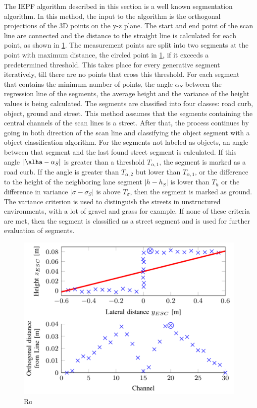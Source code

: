 \documentclass[conference]{IEEEtran}
\begin{document}
The IEPF algorithm described in this section is a well known segmentation algorithm. In this method, the input to the algorithm is the orthogonal projections of the 3D points on the y-z plane. The start and end point of the scan line are connected and the distance to the straight line is calculated for each point, as shown in \ref{fig2}. The measurement points are split into two segments at the point with maximum distance, the circled point in \ref{fig2}, if it exceeds a predetermined threshold. This takes place for every generative segment iteratively, till there are no points that cross this threshold. For each segment that contains the minimum number of points, the angle $\alpha_S$ between the regression line of the segments, the average height and the variance of the height values is being calculated. The segments are classified into four classes: road curb, object, ground and street. This method assumes that the segments containing the central channels of the scan lines is a street. After that, the process continues by going in both direction of the scan line and classifying the object segment with a object classification algorithm. For the segments not labeled as objects, an angle between that segment and the last found street segment is calculated. If this angle $|\alha - \alpha_S|$ is greater than a threshold $T_{\alpha,1}$, the segment is marked as a road curb. If the angle is greater than $T_{\alpha,2}$ but lower than $T_{\alpha,1}$, or the difference to the height of the neighboring lane segment $|h - h_S|$ is lower than $T_h$ or the difference in variance $|\sigma - \sigma_S|$ is above $T_\sigma$, then the segment is marked as ground. The variance criterion is used to distinguish the streets in unstructured environments, with a lot of gravel and grass for example. If none of these criteria are met, then the segment is classified as a street segment and is used for further evaluation of segments. 

\begin{figure}[ht]
	\centering
  \includegraphics[scale = 0.35]{pictures/iepf.pdf}
	\caption{Ro}
	\label{fig2}
\end{figure}
 
\end{document}
